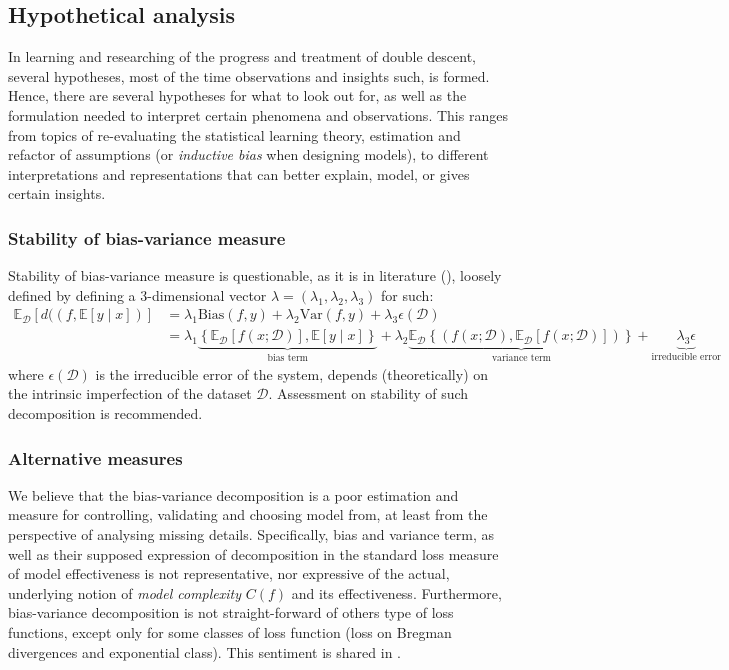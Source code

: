 \documentclass{article}
\begin{document}
\subsection{Hypothetical analysis}
In learning and researching of the progress and treatment of double descent, several hypotheses, most of the time observations and insights such, is formed. Hence, there are several hypotheses for what to look out for, as well as the formulation needed to interpret certain phenomena and observations. This ranges from topics of re-evaluating the statistical learning theory, estimation and refactor of assumptions (or \textit{inductive bias} when designing models), to different interpretations and representations that can better explain, model, or gives certain insights.  
\subsubsection{Stability of bias-variance measure}
Stability of bias-variance measure is questionable, as it is in literature (\cite{domingos_unifeid_2000}), loosely defined by defining a 3-dimensional vector $\lambda=(\lambda_{1},\lambda_{2},\lambda_{3})$ for such: 
\noindent 
\begin{equation*}
        \begin{split}
            \mathbb{E}_{\mathcal{D}} \left[d((f,\mathbb{E}[y\mid x])\right] & = \lambda_{1} \mathrm{Bias}(f,y) + \lambda_{2}\mathrm{Var}(f,y)+ \lambda_{3}\epsilon(\mathcal{D})\\ 
            & = \lambda_{1}\underbrace{\left\{ \mathbb{E}_{\mathcal{D}}[f(x;\mathcal{D})] , \mathbb{E}[y\mid x] \right\}}_{\text{bias term}} +\lambda_{2} \underbrace{\mathbb{E}_{\mathcal{D}} \left\{(f(x;\mathcal{D}), \mathbb{E}_{\mathcal{D}}[f(x;\mathcal{D})])\right\}}_{\text{variance term}} +\underbrace{\lambda_{3}\epsilon}_{\text{irreducible error}}
        \end{split}
\end{equation*}
where $\epsilon(\mathcal{D})$ is the irreducible error of the system, depends (theoretically) on the intrinsic imperfection of the dataset $\mathcal{D}$. Assessment on stability of such decomposition is recommended. 
\subsubsection{Alternative measures}
We believe that the bias-variance decomposition is a poor estimation and measure for controlling, validating and choosing model from, at least from the perspective of analysing missing details. Specifically, bias and variance term, as well as their supposed expression of decomposition in the standard loss measure of model effectiveness is not representative, nor expressive of the actual, underlying notion of \textit{model complexity} $C(f)$ and its effectiveness. Furthermore, bias-variance decomposition is not straight-forward of others type of loss functions, except only for some classes of loss function (loss on Bregman divergences and exponential class). This sentiment is shared in \cite{brown2024biasvariance}.
\end{document}
